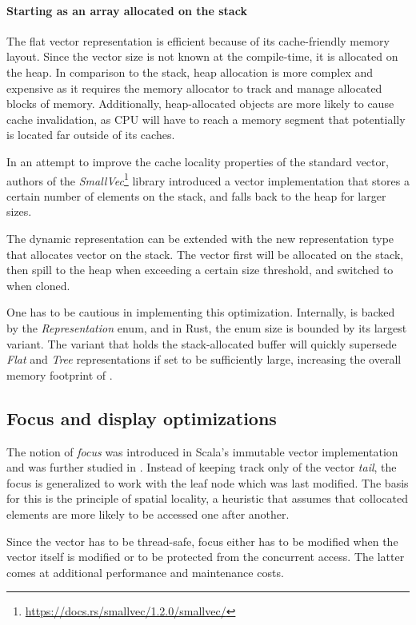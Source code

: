 \paragraph{Starting as an array allocated on the stack}
The flat vector representation is efficient because of its cache-friendly memory layout. Since the vector size is not known at the compile-time, it is allocated on the heap. In comparison to the stack, heap allocation is more complex and expensive as it requires the memory allocator to track and manage allocated blocks of memory. Additionally, heap-allocated objects are more likely to cause cache invalidation, as CPU will have to reach a memory segment that potentially is located far outside of its caches. 

In an attempt to improve the cache locality properties of the standard vector, authors of the \emph{SmallVec}\footnote{\url{https://docs.rs/smallvec/1.2.0/smallvec/}} library introduced a vector implementation that stores a certain number of elements on the stack, and falls back to the heap for larger sizes. 

The dynamic representation can be extended with the new representation type that allocates vector on the stack. The vector first will be allocated on the stack, then spill to the heap when exceeding a certain size threshold, and switched to \rrbvec{} when cloned. 

One has to be cautious in implementing this optimization. Internally, \pvec{} is backed by the \emph{Representation} enum, and in Rust, the enum size is bounded by its largest variant. The variant that holds the stack-allocated buffer will quickly supersede \emph{Flat} and \emph{Tree} representations if set to be sufficiently large, increasing the overall memory footprint of \pvec{}.

\subsection{Focus and display optimizations}
The notion of \emph{focus} was introduced in Scala's immutable vector implementation and was further studied in \cite{rrb-vector-practical-general-purpose-im-sequence}. Instead of keeping track only of the vector \emph{tail}, the focus is generalized to work with the leaf node which was last modified. The basis for this is the principle of spatial locality, a heuristic that assumes that collocated elements are more likely to be accessed one after another.

Since the vector has to be thread-safe, focus either has to be modified when the vector itself is modified or to be protected from the concurrent access. The latter comes at additional performance and maintenance costs. 


